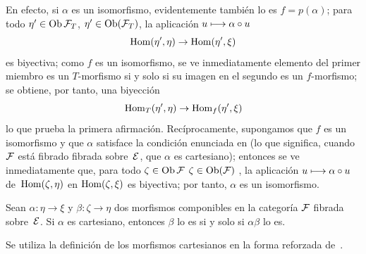 En efecto, si $\alpha$ es un isomorfismo, evidentemente también lo es
$f=p(\alpha)$; para todo
{$\eta'\in\Ob\cal{F}_T$,}
{$\eta'\in\Ob(\cal{F}_T)$,}
la aplicación $u\mto\alpha\circ u$
$$
\Hom(\eta',\eta)\to\Hom(\eta',\xi)
$$
es biyectiva; como $f$ es un isomorfismo, se ve inmediatamente
elemento del primer miembro es un $T$-morfismo si y solo si su imagen en el
segundo es un $f$-morfismo; se obtiene, por tanto, una biyección
$$
\Hom_T(\eta',\eta)\to\Hom_f(\eta',\xi)
$$
lo
que prueba la primera afirmación. Recíprocamente, supongamos que $f$ es un
isomorfismo y que $\alpha$ satisface la condición enunciada en
(lo que significa, cuando $\cal{F}$ está
{fibrado}
{fibrada}
sobre~$\cal{E}$, que $\alpha$ es cartesiano); entonces se ve
inmediatamente que, para todo
{$\zeta\in\Ob\cal{F}$}
{$\zeta\in\Ob(\cal{F})$}%
, la aplicación $u\mto\alpha\circ u$ de~$\Hom(\zeta,\eta)$ en
$\Hom(\zeta,\xi)$ es biyectiva; por tanto, $\alpha$ es un isomorfismo.
\begin{corollaire}
\label{VI.6.13} Sean $\alpha\colon\eta\to\xi$ y
$\beta\colon\zeta\to\eta$ dos morfismos componibles en la categoría
$\cal{F}$ fibrada sobre~$\cal{E}$. Si $\alpha$ es cartesiano, entonces
$\beta$ lo es si y solo si $\alpha\beta$ lo es.
\end{corollaire}

Se utiliza la definición de los morfismos cartesianos en la forma reforzada
de~.
